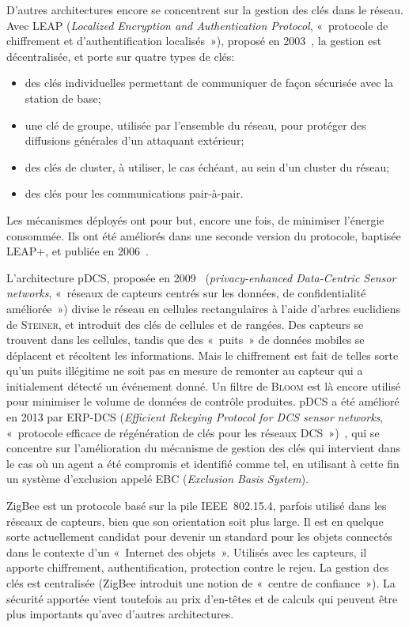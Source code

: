 D'autres architectures encore se concentrent sur la gestion des clés dans le réseau.
Avec LEAP (\textit{Localized Encryption and Authentication Protocol}, « protocole de chiffrement et d'authentification localisés »), proposé en 2003~\cite{ZSJ03}, la gestion est décentralisée, et porte sur quatre types de clés:
\begin{itemize}
    \item des clés individuelles permettant de communiquer de façon sécurisée avec la station de base;
    \item une clé de groupe, utilisée par l'ensemble du réseau, pour protéger des diffusions générales d'un attaquant extérieur;
    \item des clés de cluster, à utiliser, le cas échéant, au sein d'un cluster du réseau;
    \item des clés pour les communications pair-à-pair.
\end{itemize}
Les mécanismes déployés ont pour but, encore une fois, de minimiser l'énergie consommée.
Ils ont été améliorés dans une seconde version du protocole, baptisée LEAP+, et publiée en 2006~\cite{ZSJ03}.

L'architecture pDCS, proposée en 2009~\cite{SZZCY09} (\textit{privacy-enhanced Data-Centric Sensor networks}, « réseaux de capteurs centrés sur les données, de confidentialité améliorée ») divise le réseau en cellules rectangulaires à l'aide d'arbres euclidiens de \textsc{Steiner}, et introduit des clés de cellules et de rangées.
Des capteurs se trouvent dans les cellules, tandis que des « puits » de données mobiles se déplacent et récoltent les informations.
Mais le chiffrement est fait de telles sorte qu'un puits illégitime ne soit pas en mesure de remonter au capteur qui a initialement détecté un événement donné.
Un filtre de \textsc{Bloom} est là encore utilisé pour minimiser le volume de données de contrôle produites.
pDCS a été amélioré en 2013 par ERP-DCS (\textit{Efficient Rekeying Protocol for DCS sensor networks}, « protocole efficace de régénération de clés pour les réseaux DCS »)~\cite{HYD13}, qui se concentre sur l'amélioration du mécanisme de gestion des clés qui intervient dans le cas où un agent a été compromis et identifié comme tel, en utilisant à cette fin un système d'exclusion appelé EBC (\textit{Exclusion Basis System}).

ZigBee\cite{zigbee} est un protocole basé sur la pile IEEE~802.15.4, parfois utilisé dans les réseaux de capteurs, bien que son orientation soit plus large.
Il est en quelque sorte actuellement candidat pour devenir un standard pour les objets connectés dans le contexte d'un « Internet des objets ».
Utilisés avec les capteurs, il apporte chiffrement, authentification, protection contre le rejeu.
La gestion des clés est centralisée (ZigBee introduit une notion de « centre de confiance »).
La sécurité apportée vient toutefois au prix d'en-têtes et de calculs qui peuvent être plus importants qu'avec d'autres architectures.

